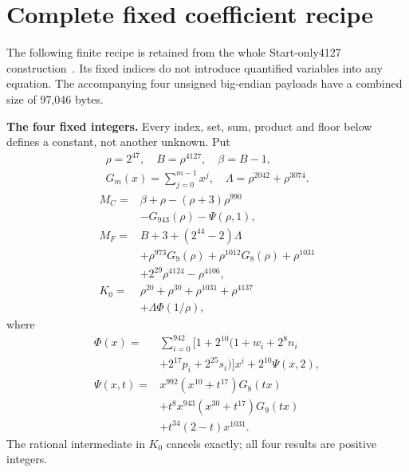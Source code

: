 \section{Complete fixed coefficient recipe}\label{sec:ordinate-constants}
The following finite recipe is retained from the whole Start-only4127 construction~\cite{proveit174}. Its fixed indices do not introduce quantified variables into any equation. The accompanying four unsigned big-endian payloads have a combined size of 97,046 bytes.\par
\begingroup
\providecommand{\Cfl}[1]{\left\lfloor#1\right\rfloor}
\providecommand{\Crg}[2]{\{#1,\ldots,#2\}}
\textbf{The four fixed integers.}
Every index, set, sum, product and floor below defines a constant, not
another unknown. Put
\[
\begin{gathered}
\rho=2^{47},\quad B=\rho^{4127},\quad\beta=B-1,\\
G_m(x)=\sum_{j=0}^{m-1}x^j,\quad
\Lambda=\rho^{2042}+\rho^{3074}.
\end{gathered}
\]
\begin{align*}
M_C={}&\beta+\rho-(\rho+3)\rho^{990}\\
&-G_{943}(\rho)-\Psi(\rho,1),\\
M_F={}&B+3+(2^{44}-2)\Lambda\\
&+\rho^{973}G_9(\rho)+\rho^{1012}G_8(\rho)
  +\rho^{1031}\\
&+2^{29}\rho^{4124}-\rho^{4106},\\
K_0={}&\rho^{20}+\rho^{30}+\rho^{1031}+\rho^{4137}\\
&+\Lambda\Phi(1/\rho),
\end{align*}
where
\[
\begin{split}
\Phi(x)={}&\sum_{i=0}^{942}[1+2^{10}(1+w_i+2^8n_i\\
&+2^{17}p_i+2^{25}s_i)]x^i+2^{10}\Psi(x,2),\\
\Psi(x,t)={}&x^{992}(x^{10}+t^{17})G_8(tx)\\
&+t^8x^{943}(x^{30}+t^{17})G_9(tx)\\
&+t^{34}(2-t)x^{1031}.
\end{split}
\]
The rational intermediate in $K_0$ cancels exactly; all four results are positive integers.

